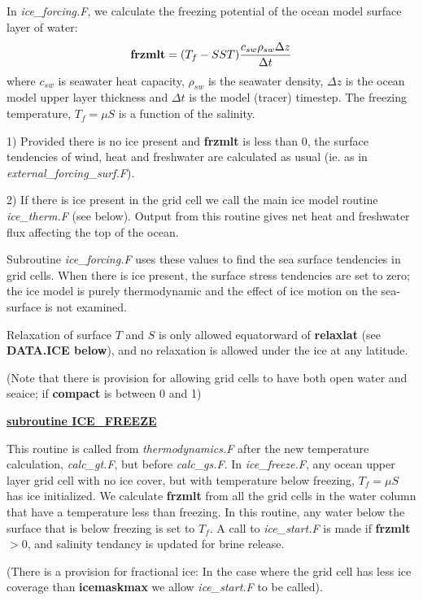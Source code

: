 \noindent
In {\it ice\_forcing.F}, we calculate the freezing potential of the
ocean model surface layer of water:
\[
  {\bf frzmlt} = (T_f - SST) \frac{c_{sw} \rho_{sw} \Delta z}{\Delta t}
\]
where $c_{sw}$ is seawater heat capacity, 
$\rho_{sw}$ is the seawater density, $\Delta z$
is the ocean model upper layer thickness and $\Delta t$ is the model (tracer)
timestep. The freezing temperature, $T_f=\mu S$ is a function of the
salinity.


1) Provided there is no ice present and {\bf frzmlt} is less than 0,
   the surface tendencies of wind, heat and freshwater are calculated
   as usual (ie. as in {\it external\_forcing\_surf.F}).

2) If there is ice present in the grid cell
   we call the main ice model routine {\it ice\_therm.F} (see below).
   Output from this routine gives net heat and freshwater flux 
   affecting the top of the ocean.

Subroutine {\it ice\_forcing.F} uses these values to find the 
sea surface tendencies
in grid cells. When there is ice present,  
the surface stress tendencies are
set to zero; the ice model is purely thermodynamic and the
effect of ice motion on the sea-surface is not examined.

Relaxation of surface $T$ and $S$ is only allowed equatorward
of {\bf relaxlat} (see {\bf DATA.ICE below}), and no relaxation is
allowed under the ice at any latitude.

\noindent
{\tiny (Note that there is provision for allowing grid cells to have both
open water and seaice; if {\bf compact} is between  0 and 1)}

\vspace{1cm}
\noindent
{\bf {\underline{ subroutine ICE\_FREEZE}}}

This routine is called from {\it thermodynamics.F}
after the new temperature calculation, {\it calc\_gt.F}, 
but before {\it calc\_gs.F}.
In {\it ice\_freeze.F}, any ocean upper layer grid cell
with no ice cover, but with temperature below freezing,
$T_f=\mu S$ has ice initialized.
We calculate {\bf frzmlt} from all the grid cells in
the water column that have a temperature less than
freezing. In this routine, any water below the surface
that is below freezing is set to $T_f$.
A call to
{\it ice\_start.F} is made if {\bf frzmlt} $>0$, 
and salinity tendancy is updated for brine release.

\noindent
{\tiny (There is a provision for fractional ice:
In the case where the grid cell has less ice coverage than
{\bf icemaskmax} we allow {\it ice\_start.F} to be called).}

